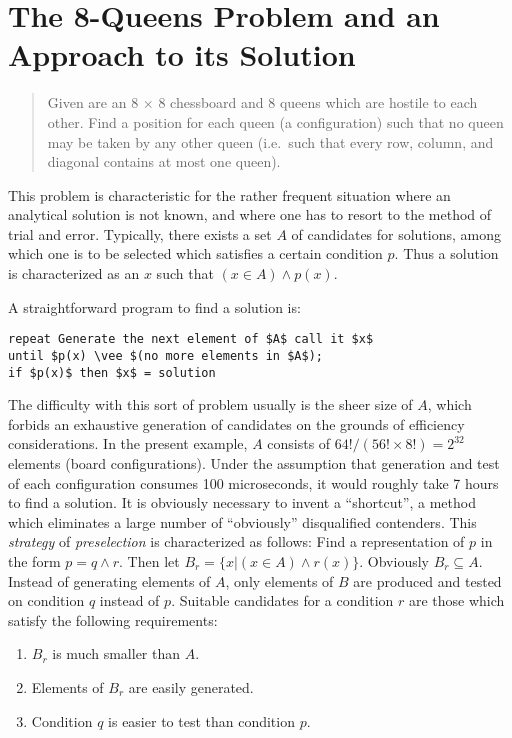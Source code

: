 \section{The 8-Queens Problem and an Approach to its Solution\autocite{dijkstra1968}}

\begin{quote}
Given are an 8 $\times$ 8 chessboard and 8 queens which are hostile to each
other. Find a position for each queen (a configuration) such that no queen may
be taken by any other queen (i.e.\ such that every row, column, and diagonal
contains at most one queen).
\end{quote}

This problem is characteristic for the rather frequent situation where an
analytical solution is not known, and where one has to resort to the method of
trial and error.  Typically, there exists a set $A$ of candidates for
solutions, among which one is to be selected which satisfies a certain
condition $p$. Thus a solution is characterized as an $x$ such that $(x \in A)
\wedge p(x)$.

A straightforward program to find a solution is:

\begin{lstlisting}[basicstyle=\small\normalfont]
repeat Generate the next element of $A$ call it $x$
until $p(x) \vee $(no more elements in $A$);
if $p(x)$ then $x$ = solution
\end{lstlisting}

The difficulty with this sort of problem usually is the sheer size of $A$,
which forbids an exhaustive generation of candidates on the grounds of
efficiency considerations.  In the present example, $A$ consists of $64!/(56!
\times 8!) = 2^{32}$ elements (board configurations).  Under the assumption
that generation and test of each configuration consumes 100 microseconds, it
would roughly take 7 hours to find a solution. It is obviously necessary to
invent a ``shortcut'', a method which eliminates a large number of
``obviously'' disqualified contenders.  This \emph{strategy} of
\emph{preselection} is characterized as follows: Find a representation of $p$
in the form $p = q \wedge r$.  Then let $B_r = \{x | (x \in A) \wedge r(x)\}$.
Obviously $B_r \subseteq A$.  Instead of generating elements of $A$, only
elements of $B$ are produced and tested on condition $q$ instead of $p$.
Suitable candidates for a condition $r$ are those which satisfy the following
requirements:

\begin{enumerate}
    \item $B_r$ is much smaller than $A$.
    \item Elements of $B_r$ are easily generated.
    \item Condition $q$ is easier to test than condition $p$.
\end{enumerate}

